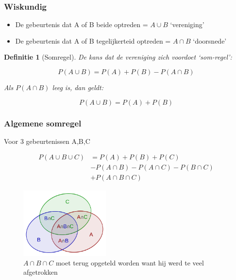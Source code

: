 \documentclass{article}
\newtheorem{theorem}{Definitie}[section]
\begin{document}
\subsubsection{Wiskundig}

\begin{itemize}
    \item De gebeurtenis dat A of B beide optreden = $A \cup B$ `vereniging'
    \item De gebeurtenis dat A of B tegelijkerteid optreden = $A \cap B$ `doorsnede'
\end{itemize}

\begin{theorem}[Somregel]
De kans dat de vereniging zich voordoet `som-regel':

\begin{equation}
    P(A \cup B) = P(A) + P(B) - P(A \cap B)
\end{equation}

Als $P(A \cap B)$ leeg is, dan geldt:

\begin{equation}
    P(A \cup B) = P(A) + P(B)
\end{equation}
\end{theorem}

\subsubsection{Algemene somregel}

Voor 3 gebeurtenissen A,B,C

\begin{equation}
    \begin{aligned}
        P(A \cup B \cup C) &= P(A) + P(B) + P(C)\\
        & - P(A \cap B) - P(A \cap C) - P(B \cap C)\\
        & + P(A \cap B \cap C)
    \end{aligned}
\end{equation}



\begin{figure}[H]
    \centering
    \includegraphics[width=0.4\textwidth]{algemene-somregel.png}
    \caption{$A \cap B \cap C$ moet terug opgeteld worden want hij werd te veel afgetrokken}
\end{figure}
\end{document}
